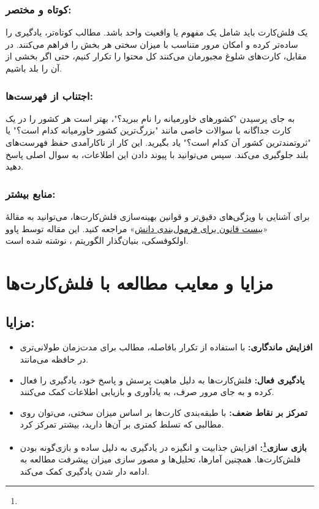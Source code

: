 \documentclass[12pt]{report}
\begin{document}
    \subsubsection{کوتاه و مختصر:} یک فلش‌کارت باید شامل یک مفهوم یا واقعیت واحد باشد. مطالب کوتاه‌تر، یادگیری را ساده‌تر کرده و امکان مرور متناسب با میزان سختی هر بخش را فراهم می‌کنند. در مقابل، کارت‌های شلوغ مجبورمان می‌کنند کل محتوا را تکرار کنیم، حتی اگر بخشی از آن را بلد باشیم.

    \subsubsection{اجتناب از فهرست‌ها:} به جای پرسیدن "کشورهای خاورمیانه را نام ببرید؟"، بهتر است هر کشور را در یک کارت جداگانه با سوالات خاصی مانند "بزرگ‌ترین کشور خاورمیانه کدام است؟" یا "ثروتمندترین کشور آن کدام است؟" یاد بگیرید. این کار از ناکارآمدی حفظ فهرست‌های بلند جلوگیری می‌کند. سپس می‌توانید با پیوند دادن این اطلاعات، به سوال اصلی پاسخ دهید.
    
    \subsubsection{منابع بیشتر:} برای آشنایی با ویژگی‌های دقیق‌تر و قوانین بهینه‌سازی فلش‌کارت‌ها، می‌توانید به مقالهٔ 
    «\href{https://super-memory.com/articles/20rules.htm}{بیست قانون برای فرمول‌بندی دانش}»
\cite{20rules}
    مراجعه کنید. این مقاله توسط پاوو اولکوفسکی، بنیان‌گذار الگوریتم ، نوشته شده است.

\section{مزایا و معایب مطالعه با فلش‌کارت‌ها}


\subsection*{مزایا:}
\begin{itemize}
    \item \textbf{افزایش ماندگاری:} با استفاده از تکرار بافاصله، مطالب برای مدت‌زمان طولانی‌تری در حافظه می‌مانند.
    \item \textbf{یادگیری فعال:} فلش‌کارت‌ها به دلیل ماهیت پرسش و پاسخ خود، یادگیری را فعال کرده و به جای مرور صرف، به یادآوری و بازیابی اطلاعات کمک می‌کنند.
    \item \textbf{تمرکز بر نقاط ضعف:} با طبقه‌بندی کارت‌ها بر اساس میزان سختی، می‌توان روی مطالبی که تسلط کمتری بر آن‌ها دارید، بیشتر تمرکز کرد.
    \item \textbf{بازی سازی\footnote{}:} افزایش جذابیت و انگیزه در یادگیری به دلیل ساده 
    و بازی‌گونه بودن فلش‌کارت‌ها.
     همچنین آمارها، تحلیل‌ها و مصور سازی
      میزان پیشرفت مطالعه به ادامه دار شدن یادگیری کمک می‌کند.
\end{itemize}
\end{document}
